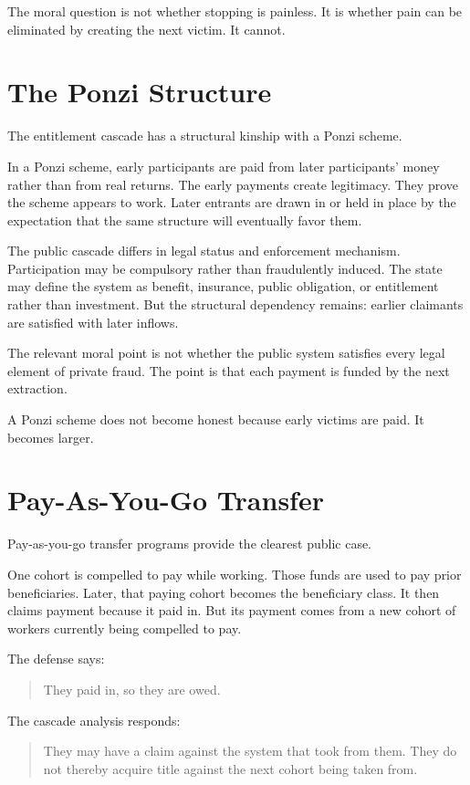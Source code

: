 \documentclass[12pt]{article}
\begin{document}
The moral question is not whether stopping is painless. It is whether pain can be eliminated by creating the next victim. It cannot.

\section{The Ponzi Structure}

The entitlement cascade has a structural kinship with a Ponzi scheme.

In a Ponzi scheme, early participants are paid from later participants' money rather than from real returns. The early payments create legitimacy. They prove the scheme appears to work. Later entrants are drawn in or held in place by the expectation that the same structure will eventually favor them.

The public cascade differs in legal status and enforcement mechanism. Participation may be compulsory rather than fraudulently induced. The state may define the system as benefit, insurance, public obligation, or entitlement rather than investment. But the structural dependency remains: earlier claimants are satisfied with later inflows.

The relevant moral point is not whether the public system satisfies every legal element of private fraud. The point is that each payment is funded by the next extraction.

A Ponzi scheme does not become honest because early victims are paid. It becomes larger.

\section{Pay-As-You-Go Transfer}

Pay-as-you-go transfer programs provide the clearest public case.

One cohort is compelled to pay while working. Those funds are used to pay prior beneficiaries. Later, that paying cohort becomes the beneficiary class. It then claims payment because it paid in. But its payment comes from a new cohort of workers currently being compelled to pay.

The defense says:

\begin{quote}
They paid in, so they are owed.
\end{quote}

The cascade analysis responds:

\begin{quote}
They may have a claim against the system that took from them. They do not thereby acquire title against the next cohort being taken from.
\end{quote}
\end{document}
